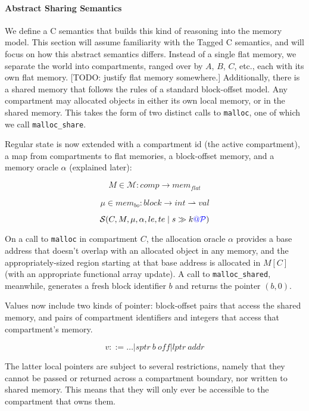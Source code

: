 \documentclass{article}
\begin{document}
\paragraph{Abstract Sharing Semantics}

We define a C semantics that builds this kind of reasoning into the memory model. This section
will assume familiarity with the Tagged C semantics, and will focus on how this abstract semantics
differs. Instead of a single flat memory, we separate the world
into compartments, ranged over by \(A\), \(B\), \(C\), etc., each with its own flat memory.
[TODO: justify flat memory somewhere.] Additionally, there is a shared memory that follows the
rules of a standard block-offset model. Any compartment may allocated objects in either its own
local memory, or in the shared memory. This takes the form of two distinct calls to {\tt malloc},
one of which we call {\tt malloc\_share}.

Regular state is now extended with a compartment id (the active compartment), a map from
compartments to flat memories, a block-offset memory, and a memory oracle \(\alpha\) (explained later):

\[M \in \mathcal{M} : \mathit{comp} \rightarrow \mathit{mem}_{\mathit{flat}}\]

\[\mu \in \mathit{mem}_{bo} : \mathit{block} \rightarrow \mathit{int} \rightharpoonup \mathit{val}\]

\[\mathcal{S}(C, M, \mu, \alpha, le, te \mid s \gg k {\color{blue} @} \mathcal{\color{blue} P\mathit{}})\]

On a call to {\tt malloc} in compartment \(C\), the allocation oracle \(\alpha\) provides a base
address that doesn't overlap with an allocated object in any memory, and the appropriately-sized
region starting at that base address is allocated in \(M[C]\) (with an appropriate functional array
update). A call to {\tt malloc\_shared}, meanwhile, generates a fresh block identifier \(b\)
and returns the pointer \((b,0)\).

Values now include two kinds of pointer: block-offset pairs that access the shared memory,
and pairs of compartment identifiers and integers that access that compartment's memory.

\[v ::= \dots | \mathit{sptr} ~ b ~ \mathit{off} | \mathit{lptr} ~ \mathit{addr}\]

The latter local pointers are subject to several restrictions, namely that they cannot be
passed or returned across a compartment boundary, nor written to shared memory. This means
that they will only ever be accessible to the compartment that owns them.
\end{document}
